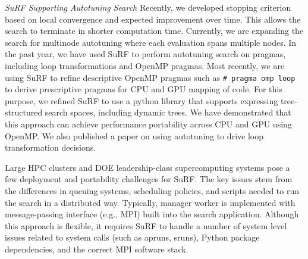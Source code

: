 \vspace*{.1in}
\noindent
\textit{SuRF Supporting Autotuning Search}
Recently, we developed stopping criterion based on local convergence and expected improvement over time. This allows the search to terminate in shorter computation time. Currently, we are expanding the search for multinode autotuning where each evaluation spans multiple nodes.
In the past year, we have used SuRF to perform autotuning search on
pragmas, including loop transformations and OpenMP pragmas. Most recently,
we are using SuRF to refine descriptive OpenMP pragmas such as \texttt{\# pragma omp loop} to derive prescriptive pragmas for CPU and GPU mapping of code.  For this purpose, we refined SuRF to use a python library that supports expressing tree-structured search spaces, including dynamic trees.  We have demonstrated that this approach can achieve performance portability across CPU and GPU using OpenMP.   We also published a paper on using autotuning to drive loop transformation decisions.


Large HPC clusters and DOE leadership-class supercomputing systems pose a few deployment and portability challenges for SuRF. The key issues stem from the differences in queuing systems, scheduling policies, and scripts needed to run the search in a distributed way. Typically, manager worker is implemented with message-passing interface (e.g., MPI) built into the search application. Although this approach is flexible, it requires SuRF to handle a number of system level issues related to system calls (such as apruns, sruns), Python package dependencies, and the correct MPI software stack.

